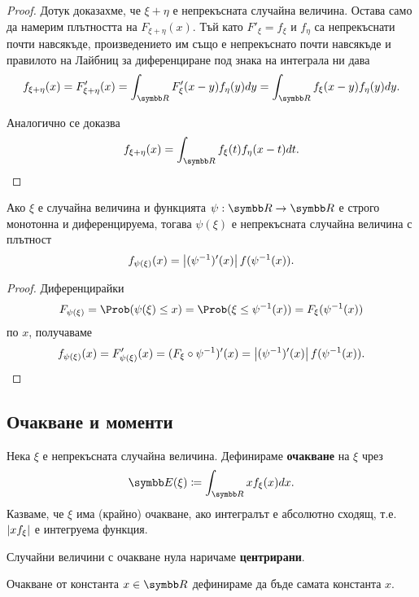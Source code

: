 \documentclass[
  headings=standardclasses,
  bibliography=totocnumbered,
]{scrartcl}
\begin{document}
\begin{proof}
  Дотук доказахме, че \( \xi + \eta \) е непрекъсната случайна величина. Остава само да намерим плътността на \( F_{\xi + \eta}(x) \). Тъй като \( F'_\xi = f_\xi \) и \( f_\eta \) са непрекъснати почти навсякъде, произведението им също е непрекъснато почти навсякъде и правилото на Лайбниц за диференциране под знака на интеграла ни дава
  \begin{equation*}
    f_{\xi + \eta} (x)
    =
    F'_{\xi + \eta} (x)
    =
    \int_{\R} F'_\xi(x - y) f_\eta(y) dy
    =
    \int_{\R} f_\xi(x - y) f_\eta(y) dy.
  \end{equation*}

  Аналогично се доказва
  \begin{equation*}
    f_{\xi + \eta} (x)
    =
    \int_{\R} f_\xi(t) f_\eta(x - t) dt.
  \end{equation*}
\end{proof}

\begin{proposition}\label{thm:density_of_transformed_variable}
  Ако \( \xi \) е случайна величина и функцията \( \psi: \R \to \R \) е строго монотонна и диференцируема, тогава \( \psi(\xi) \) е непрекъсната случайна величина с плътност
  \begin{equation*}
    f_{\psi(\xi)} (x)
    =
    \left\vert (\psi^{-1})'(x) \right\vert f(\psi^{-1}(x)).
  \end{equation*}
\end{proposition}
\begin{proof} Диференцирайки
  \begin{equation*}
    F_{\psi(\xi)} = \Prob(\psi(\xi) \leq x) = \Prob(\xi \leq \psi^{-1}(x)) = F_\xi(\psi^{-1}(x))
  \end{equation*}
  по \( x \), получаваме
  \begin{equation*}
    f_{\psi(\xi)} (x)
    =
    F'_{\psi(\xi)} (x)
    =
    (F_{\xi} \circ \psi^{-1})'(x)
    =
    \left\vert (\psi^{-1})'(x) \right\vert f(\psi^{-1}(x)).
  \end{equation*}
\end{proof}

\subsection{Очакване и моменти}

\begin{definition}
  Нека \( \xi \) е непрекъсната случайна величина. Дефинираме \textbf{очакване} на \( \xi \) чрез
  \begin{equation*}
    \Expect(\xi) \coloneqq \int_{\R} x f_\xi(x) dx.
  \end{equation*}
  Казваме, че \( \xi \) има (крайно) очакване, ако интегралът е абсолютно сходящ, т.е. \( \left\vert x f_\xi \right\vert \) е интегруема функция.

  Случайни величини с очакване нула наричаме \textbf{центрирани}.

  Очакване от константа \( x \in \R \) дефинираме да бъде самата константа \( x \).
\end{definition}
\end{document}
